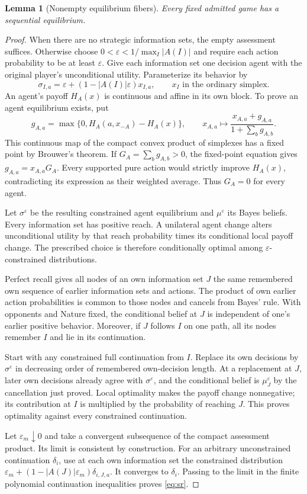 \documentclass[11pt,a4paper]{article}
\numberwithin{equation}{section}
\newtheorem{lemma}[theorem]{Lemma}
\theoremstyle{definition}
\begin{document}
\begin{lemma}[Nonempty equilibrium fibers]\label{lem:existence}
Every fixed admitted game has a sequential equilibrium.
\end{lemma}
\begin{proof}
When there are no strategic information sets, the empty assessment
suffices. Otherwise choose \(0<\varepsilon<1/\max_I|A(I)|\) and require
each action probability to be at least \(\varepsilon\).
Give each information set one decision agent with the original
player's unconditional utility. Parameterize its behavior by
\[
 \sigma_{I,a}=\varepsilon+
                  (1-|A(I)|\varepsilon)x_{I,a},
 \qquad x_I\text{ in the ordinary simplex}.
\]
An agent's payoff \(H_A(x)\) is continuous and affine in its own block.
To prove an agent equilibrium exists, put
\[
 g_{A,a}=\max\{0,H_A(a,x_{-A})-H_A(x)\},\qquad
 x_{A,a}\longmapsto
       \frac{x_{A,a}+g_{A,a}}{1+\sum_b g_{A,b}}.
\]
This continuous map of the compact convex product of simplexes has
a fixed point by Brouwer's theorem. If
\(G_A=\sum_b g_{A,b}>0\), the fixed-point equation gives
\(g_{A,a}=x_{A,a}G_A\). Every supported pure action would strictly
improve \(H_A(x)\), contradicting its expression as their weighted
average. Thus \(G_A=0\) for every agent.

Let \(\sigma^\varepsilon\) be the resulting constrained agent equilibrium
and \(\mu^\varepsilon\) its Bayes beliefs. Every information set has
positive reach. A unilateral agent change alters unconditional utility
by that reach probability times its conditional local payoff change.
The prescribed choice is therefore conditionally optimal among
\(\varepsilon\)-constrained distributions.

Perfect recall gives all nodes of an own information set \(J\) the same
remembered own sequence of earlier information sets and actions.
The product of own earlier action probabilities is common to those
nodes and cancels from Bayes' rule. With opponents and Nature fixed,
the conditional belief at \(J\) is independent of one's earlier
positive behavior. Moreover, if \(J\) follows \(I\) on one path,
all its nodes remember \(I\) and lie in its continuation.

Start with any constrained full continuation from \(I\). Replace its
own decisions by \(\sigma^\varepsilon\) in decreasing order of remembered
own-decision length. At a replacement at \(J\), later own decisions
already agree with \(\sigma^\varepsilon\), and the conditional belief
is \(\mu^\varepsilon_J\) by the cancellation just proved.
Local optimality makes the payoff change nonnegative; its contribution
at \(I\) is multiplied by the probability of reaching \(J\).
This proves optimality against every constrained continuation.

Let \(\varepsilon_m\downarrow0\) and take a convergent subsequence of
the compact assessment product. Its limit is consistent by construction.
For an arbitrary unconstrained continuation \(\delta_i\), use at each
own information set the constrained distribution
\(\varepsilon_m+(1-|A(J)|\varepsilon_m)\delta_{i,J,a}\).
It converges to \(\delta_i\). Passing to the limit in the finite
polynomial continuation inequalities proves \eqref{eq:sr}.
\end{proof}
\end{document}
